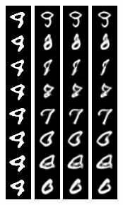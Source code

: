 \begin{figure}[]
{\includegraphics[width=0.06\columnwidth]{figures/MNIST_evolution/train_image_6.png}
\includegraphics[width=0.06\columnwidth]{figures/MNIST_evolution/train_image_8.png}
\includegraphics[width=0.06\columnwidth]{figures/MNIST_evolution/train_image_10.png}
\includegraphics[width=0.06\columnwidth]{figures/MNIST_evolution/train_image_20.png}
}
\end{figure}
